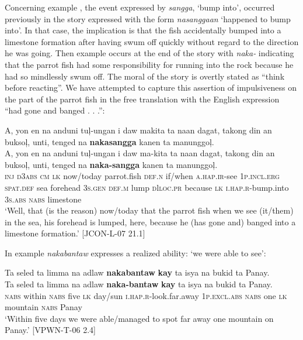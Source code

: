 Concerning example , the event expressed by \textit{sangga}, ‘bump into’, occurred previously in the story expressed with the form \textit{nasanggaan} ‘happened to bump into’. In that case, the implication is that the fish accidentally bumped into a limestone formation after having swum off quickly without regard to the direction he was going. Then example  occurs at the end of the story with \textit{naka-} indicating that the parrot fish had some responsibility for running into the rock because he had so mindlessly swum off. The moral of the story is overtly stated as “think before reacting”. We have attempted to capture this assertion of impulsiveness on the part of the parrot fish in the free translation with the English expression “had gone and banged . . .”:

\ea
\label{bkm:Ref448309255}
A,  yon  en  na  anduni  tuļ-ungan  i  daw  makita ta  naan  dagat,  takong  din  an  buksoļ,  unti, tenged  na  \textbf{nakasangga}  kanen  ta  manunggoļ. \\\smallskip
 \gll A,  yon  en  na  anduni  tuļ{}-ungan  i  daw  ma-kita ta  naan  dagat,  takong  din  an  buksoļ,  unti, tenged  na  \textbf{naka-sangga}  kanen  ta  manunggoļ. \\
\textsc{inj}  \textsc{d}3\textsc{abs}  \textsc{cm}  \textsc{lk}  now/today  parrot.fish  \textsc{def.n}  if/when  \textsc{a.hap.ir}-see 1\textsc{p.incl.erg}  \textsc{spat.def} sea  forehead  3\textsc{s.gen}  \textsc{def.m} lump \textsc{d}l\textsc{loc.pr} because  \textsc{lk}  \textsc{i.hap.r}-bump.into  3\textsc{s.abs}  \textsc{nabs}  limestone \\
\glt `Well, that (is the reason) now/today that the parrot fish when we see (it/them) in the sea, his forehead is lumped, here, because he (has gone and) banged into a limestone formation.’ [JCON-L-07 21.1]
\z

In example  \textit{nakabantaw} expresses a realized ability: ‘we were able to see’:

\ea
\label{bkm:Ref392929987}
Ta  seled  ta  limma  na  adlaw  \textbf{nakabantaw}  \textbf{kay} ta  isya  na  bukid  ta  Panay. \\\smallskip
 \gll Ta  seled  ta  limma  na  adlaw  \textbf{naka-bantaw}  \textbf{kay} ta  isya  na  bukid  ta  Panay. \\
\textsc{nabs}  within  \textsc{nabs}  five  \textsc{lk}  day/sun  \textsc{i.hap.r}-look.far.away  1\textsc{p.excl.abs}
\textsc{nabs}  one  \textsc{lk}  mountain  \textsc{nabs}  Panay \\
\glt `Within five days we were able/managed to spot far away one mountain on Panay.’ [VPWN-T-06 2.4]
\z

